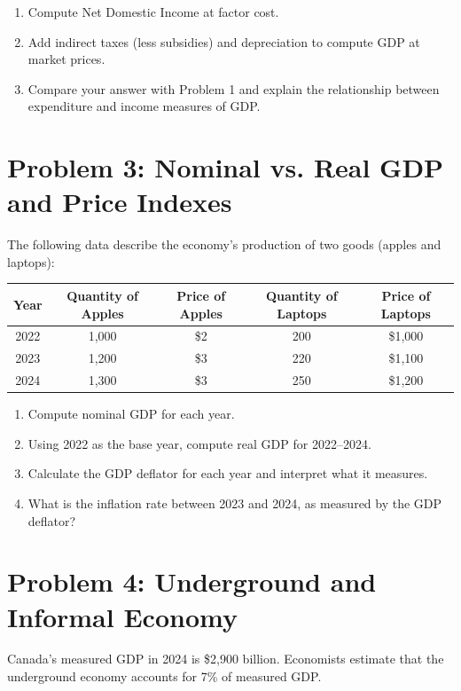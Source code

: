 \documentclass[11pt]{article}
\begin{document}
\begin{enumerate}[label=\alph*)]
    \item Compute Net Domestic Income at factor cost.  
    \item Add indirect taxes (less subsidies) and depreciation to compute GDP at market prices.  
    \item Compare your answer with Problem 1 and explain the relationship between expenditure and income measures of GDP.  
\end{enumerate}

\bigskip

\section*{Problem 3: Nominal vs. Real GDP and Price Indexes}
The following data describe the economy’s production of two goods (apples and laptops):  

\begin{center}
\begin{tabular}{c c c c c}
\toprule
Year & Quantity of Apples & Price of Apples & Quantity of Laptops & Price of Laptops \\
\midrule
2022 & 1,000 & \$2 & 200 & \$1,000 \\
2023 & 1,200 & \$3 & 220 & \$1,100 \\
2024 & 1,300 & \$3 & 250 & \$1,200 \\
\bottomrule
\end{tabular}
\end{center}

\begin{enumerate}[label=\alph*)]
    \item Compute nominal GDP for each year.  
    \item Using 2022 as the base year, compute real GDP for 2022--2024.  
    \item Calculate the GDP deflator for each year and interpret what it measures.  
    \item What is the inflation rate between 2023 and 2024, as measured by the GDP deflator?  
\end{enumerate}

\bigskip

\section*{Problem 4: Underground and Informal Economy}
Canada’s measured GDP in 2024 is \$2{,}900 billion. Economists estimate that the underground economy accounts for 7\% of measured GDP.  
\end{document}
